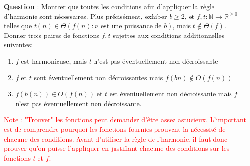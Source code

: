 \documentclass[11pt]{article} %
\newenvironment{question}[1][\unskip]{%
	\par
	\noindent
	\textbf{Question #1:}
	\noindent}
{\medskip}
\begin{document}
	\begin{question}
		Montrer que toutes les conditions afin d'appliquer la règle d'harmonie sont nécessaires. Plus précisément, exhiber $b\geq 2$, et $f, t: \mathbb{N}\rightarrow\mathbb{R}^{\geq 0}$ telles que $t(n) \in \Theta(f(n): n\text{ est une puissance de }b)$, mais $t \notin \Theta(f)$. Donner trois paires de fonctions $f,t$ sujettes aux conditions additionnelles suivantes:
		\begin{enumerate}
			\item {$f$ est harmonieuse, mais $t$ n'est pas éventuellement non décroissante}
			\item {$f$ et $t$ sont éventuellement non décroissantes mais $f(bn) \notin O(f(n))$}
			\item{$f(b(n)) \in O(f(n))$ et $t$ est éventuellement non décroissante mais $f$ n'est pas éventuellement non décroissante.}
		\end{enumerate}
	\end{question}
	\textcolor{red}{Note : "Trouver" les fonctions peut demander d'être assez astucieux. L'important est de comprendre pourquoi les fonctions fournies prouvent la nécessité de chacune des conditions. Avant d'utiliser la règle de l'harmonie, il faut donc prouver qu'on puisse l'appliquer en justifiant chacune des conditions sur les fonctions $t$ et $f$.}
	
\end{document}
